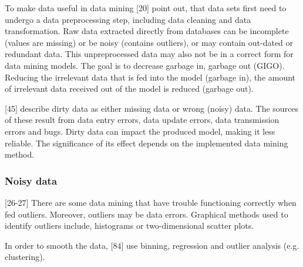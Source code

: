 

To make data useful in data mining \textcite{DataMiningAndPredictiveAnalytics}[20] point out, that data sets first need to undergo a data preprocessing step, including data cleaning and data transformation. Raw data extracted directly from databases can be incomplete (values are missing) or be noisy (contains outliers), or may contain out-dated or redundant data. This unpreprocessed data may also not be in a correct form for data mining models. The goal is to decrease garbage in, garbage out (GIGO). Reducing the irrelevant data that is fed into the model (garbage in), the amount of irrelevant data received out of the model is reduced (garbage out).


\textcite{dataPreprocessingInDataMining}[45] describe dirty data as either missing data or wrong (noisy) data. The sources of these result from data entry errors, data update errors, data transmission errors and bugs. Dirty data can impact the produced model, making it less reliable. The significance of its effect depends on the implemented data mining method.


\subsubsection{Noisy data}

\textcite{DataMiningAndPredictiveAnalytics}[26-27] 
There are some data mining that have trouble functioning correctly when fed outliers. Moreover, outliers may be data errors. Graphical methods used to identify outliers include, histograms or two-dimensional scatter plots.

In order to smooth the data, \textcite{han2011data}[84] use binning, regression and outlier analysis (e.g. clustering).


